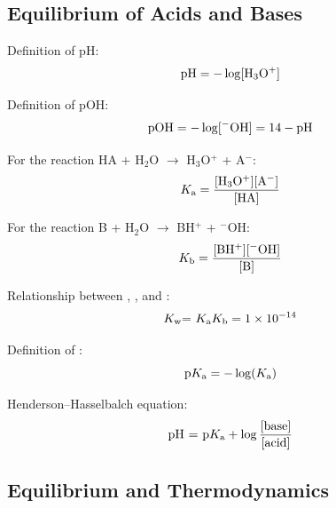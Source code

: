 \documentclass[10pt]{article}
\begin{document}
\subsection{Equilibrium of Acids and Bases}

Definition of pH:
\begin{equation*}
\textnormal{pH} = -\log[\textnormal{H$_3$O$^{+}$}]
\end{equation*}

Definition of pOH:
\begin{equation*}
\textnormal{pOH} = -\log[\textnormal{$^{-}$OH}] = 14-\textnormal{pH}
\end{equation*}

For the reaction HA + H$_2$O $\longrightarrow$ H$_3$O$^{+}$ + A$^{-}$:
\begin{equation*}
\textnormal{$K_{\textnormal{a}}$} = \frac{[\textnormal{H$_3$O$^{+}$}][\textnormal{A$^{-}$}]}{[\textnormal{HA}]}
\end{equation*}

For the reaction B + H$_2$O $\longrightarrow$ BH$^{+}$ + $^{-}$OH:
\begin{equation*}
\textnormal{$K_{\textnormal{b}}$} = \frac{\textnormal{[BH$^{+}$][$^{-}$OH]}}{\textnormal{[B]}}
\end{equation*}

Relationship between \Ka, \Kb, and \Kw:
\begin{equation*}
\textnormal{$K_{\textnormal{w}}$= $K_{\textnormal{a}}$$K_{\textnormal{b}}$} = \num{1e-14}
\end{equation*}

Definition of \pKa:
\begin{equation*}
\textnormal{p$K_{\textnormal{a}}$} = -\log(\textnormal{$K_{\textnormal{a}}$})
\end{equation*}

Henderson--Hasselbalch equation:
\begin{equation*}
\textnormal{pH = p$K_{\textnormal{a}}$} + \log \frac{\textnormal{[base]}}{\textnormal{[acid]}}
\end{equation*}


\subsection{Equilibrium and Thermodynamics}
\end{document}
